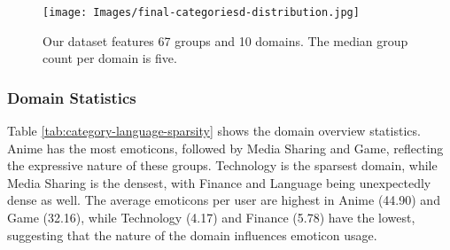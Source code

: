 \begin{figure}[htbp] 
    \centering \texttt{[image: Images/final-categoriesd-distribution.jpg]} 
    \caption{Our dataset features 67 groups and 10 domains. The median group count per domain is five.} 
\label{fig:piechart-categories-group-distribution} 
\end{figure}

\subsubsection{Domain Statistics}
Table \ref{tab:category-language-sparsity} shows the domain overview statistics. Anime has the most emoticons, followed by Media Sharing and Game, reflecting the expressive nature of these groups. Technology is the sparsest domain, while Media Sharing is the densest, with Finance and Language being unexpectedly dense as well. The average emoticons per user are highest in Anime (44.90) and Game (32.16), while Technology (4.17) and Finance (5.78) have the lowest, suggesting that the nature of the domain influences emoticon usage.


